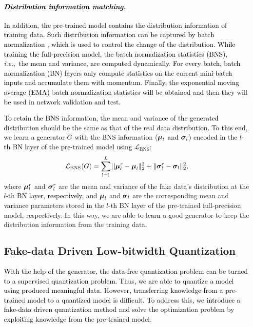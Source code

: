 \documentclass[runningheads]{llncs}
\def\ie{\emph{i.e}\onedot}
\def\ie{\mbox{\textit{i.e.}, }}
\def\bns{\mathrm{BNS}}
\def\bmu{\mbox{{\boldmath $\mu$}}}
\def\bsigma{\mbox{{\boldmath $\sigma$}}}
\def\mL{{\mathcal L}}
\def\xsk{\textcolor{black}}
\def\jie{\textcolor{black}}
\def\new{\textcolor{black}}
\begin{document}
\paragraph{\emph{\textbf{\jie{Distribution information matching.}}}}
\jie{
\new{In addition}, the pre-trained model contains the distribution information of training data.
Such distribution information can be captured by batch normalization \cite{ioffe2015batch}, which is used to control the change of the distribution.
\xsk{While training the full-precision model, the batch normalization statistics (BNS), \ie the mean and variance, are computed dynamically.
For every batch, batch normalization (BN) layers only compute statistics on the current mini-batch inputs and accumulate them with  momentum.
\new{Finally}, the exponential moving average (EMA) batch normalization statistics will be obtained and then they will be used in network validation and test.}
}

\jie{
To retain the BNS information, the mean and variance of the generated distribution should be the same as that of the real data distribution.}
\jie{
To this end, we learn a generator $G$ with the BNS information ($\bmu_l$ and $\bsigma_l$) encoded in the $l$-th BN layer of the pre-trained model using $\mL_\bns$:
}
\begin{eqnarray}
\mL_\bns(G)=\sum_{l=1}^L\|\bmu_l^r-\bmu_l\|_2^2+\|\bsigma_l^r-\bsigma_l\|_2^2,
\end{eqnarray}
where $\bmu_l^r$ and $\bsigma_l^r$ are the mean and variance of the fake data’s distribution at the $l$-th BN layer, \new{respectively,} and $\bmu_l$ and $\bsigma_l$ are the corresponding mean and variance parameters stored in the $l$-th BN layer of the pre-trained full-precision model\new{, respectively}.
In this way, we are able to \new{learn} a good generator to keep the distribution information from the training data.

\subsection{Fake-data Driven Low-bitwidth Quantization}
\label{finetune}

\jie{With the help of the generator, 
the data-free quantization problem can be turned to a supervised quantization problem.
Thus, we are able to quantize a model using produced meaningful data. 
However, \new{transferring} knowledge from a pre-trained model to a quantized model is difficult.
To address this, we introduce a fake-data driven quantization method and solve the optimization problem by \new{exploiting} knowledge from the pre-trained model. 
}
\end{document}

